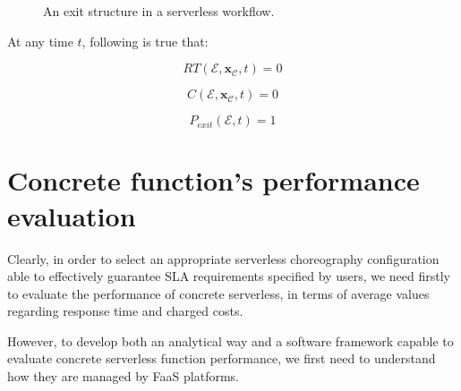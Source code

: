 \documentclass[12pt,a4paper]{report}
\begin{document}
\begin{figure}[h!]
	\centering
	\caption{An exit structure in a serverless workflow.}
\end{figure}


At any time $t$, following is true that:

\begin{equation}
	RT(\mathcal{E},\textbf{x}_{\mathcal{C}}, t) = 0
\end{equation}

\begin{equation}
	C(\mathcal{E},\textbf{x}_{\mathcal{C}}, t) = 0
\end{equation}

\begin{equation}
	P_{exit}(\mathcal{E}, t) = 1
\end{equation}



\section{Concrete function's performance evaluation}

Clearly, in order to select an appropriate serverless choreography configuration able to effectively guarantee SLA requirements specified by users, we need firstly to evaluate the performance of concrete serverless, in terms of average values regarding response time and charged costs.

However, to develop both an analytical way and a software framework capable to evaluate concrete serverless function performance, we first need to understand
how they are managed by FaaS platforms.
\end{document}
